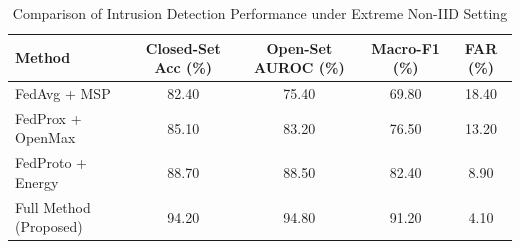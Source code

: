 \begin{table}[t]
\centering
\caption{Comparison of Intrusion Detection Performance under Extreme Non-IID Setting}
\label{tab:benchmark_results}
\begin{tabular}{lcccc}
\hline
\textbf{Method} & \textbf{Closed-Set Acc (\%)} & \textbf{Open-Set AUROC (\%)} & \textbf{Macro-F1 (\%)} & \textbf{FAR (\%)} \\
\hline
FedAvg + MSP & 82.40 & 75.40 & 69.80 & 18.40 \\
FedProx + OpenMax & 85.10 & 83.20 & 76.50 & 13.20 \\
FedProto + Energy & 88.70 & 88.50 & 82.40 & 8.90 \\
Full Method (Proposed) & 94.20 & 94.80 & 91.20 & 4.10 \\
\hline
\end{tabular}
\end{table}